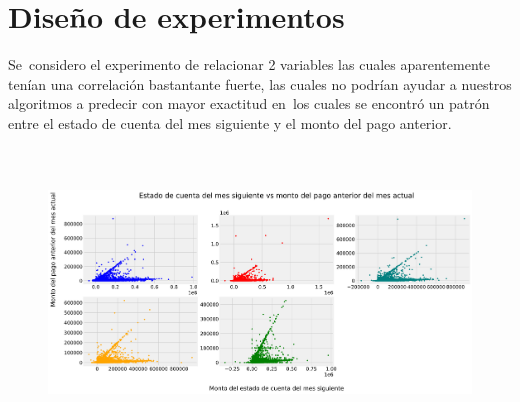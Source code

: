 \documentclass[12pt]{report}
\renewcommand{\_}{\kern-1.5pt\textunderscore\kern-1.5pt}
\begin{document}
\vspace{\baselineskip}
\section{Diseño de experimentos}
Se\ considero el experimento de relacionar 2 variables las cuales aparentemente tenían una correlación bastantante fuerte, las cuales no podrían ayudar a nuestros algoritmos a  predecir con mayor exactitud
en\ los cuales se encontró un patrón entre  el estado de cuenta del mes siguiente y el monto del pago anterior.

\vspace{\baselineskip}



\begin{figure}[H]
	\begin{Center}
		\includegraphics[width=6.27in,height=3.01in]{./media/image10.png}
	\end{Center}
\end{figure}




\vspace{\baselineskip} 

\vspace{\baselineskip}

\vspace{\baselineskip}

\vspace{\baselineskip}

\vspace{\baselineskip}

\vspace{\baselineskip}
\end{document}
